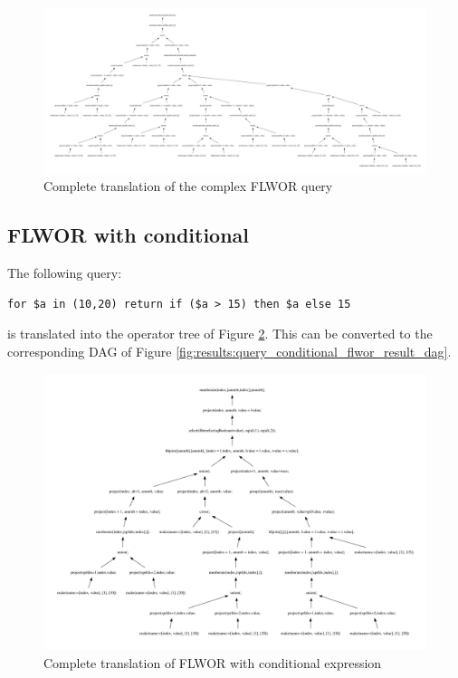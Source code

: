 \newpage
\begin{figure}[!htp]
\begin{center}
  \includegraphics[angle=90,height=0.93\textheight]{img/graphs/td_impl_flwor_complex_xq_relalg} \caption{Complete
  translation of the complex FLWOR query}
  \label{fig:results:query_complex_flwor_result}
\end{center}
\end{figure}


\newpage

\subsection{FLWOR with conditional}
\label{sect:results:algebra:generated:conditional_flwor}

The following query:
\begin{Verbatim}
for $a in (10,20) return if ($a > 15) then $a else 15
\end{Verbatim}

is translated into the operator tree of Figure \ref{fig:results:query_conditional_flwor_result}. This can be
converted to the corresponding DAG of Figure \ref{fig:results:query_conditional_flwor_result_dag}.

\begin{figure}[!htp]
\begin{center}
  \includegraphics[width=1.0\textwidth]{img/graphs/td_impl_flwor_ifthenelse_xq_relalg}
  \caption{Complete translation of FLWOR with conditional expression}
  \label{fig:results:query_conditional_flwor_result}
\end{center}
\end{figure}

